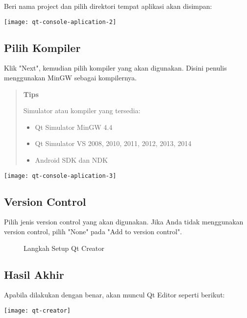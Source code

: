 Beri nama project dan pilih direktori tempat aplikasi akan disimpan:

  \begin{center}
  \texttt{[image: qt-console-aplication-2]}
  \end{center}

\subsection{Pilih Kompiler}

Klik "Next", kemudian pilih kompiler yang akan digunakan. Disini penulis menggunakan MinGW sebagai kompilernya.

\begin{quotation}
{\LARGE {}} \textbf{Tips}

Simulator atau kompiler yang tersedia:
\begin{itemize}
\item Qt Simulator MinGW 4.4
\item Qt Simulator VS 2008, 2010, 2011, 2012, 2013, 2014
\item Android SDK dan NDK
\end{itemize}
\end{quotation}

\begin{center}
\texttt{[image: qt-console-aplication-3]}
\end{center}

\subsection{Version Control}

Pilih jenis version control yang akan digunakan. Jika Anda tidak menggunakan version control, pilih "None" pada "Add to version control".

\begin{figure}[htbp]
\centering
{}
\caption{Langkah Setup Qt Creator}
\end{figure}

\subsection{Hasil Akhir}

Apabila dilakukan dengan benar, akan muncul Qt Editor seperti berikut:

\begin{center}
\texttt{[image: qt-creator]}
\end{center}

